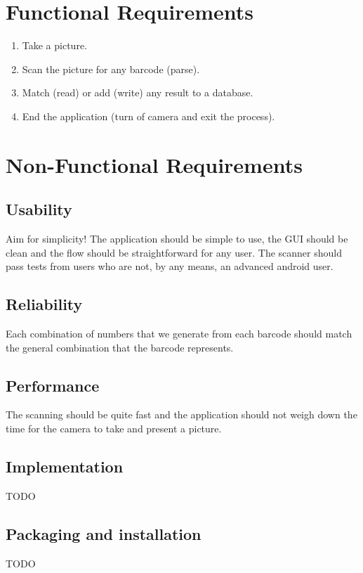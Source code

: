 \documentclass{report}
\begin{document}
\section{Functional Requirements}

\begin{enumerate}
  \item Take a picture.
  \item Scan the picture for any barcode (parse).
  \item Match (read) or add (write) any result to a database.
  \item End the application (turn of camera and exit the process).
\end{enumerate}

\section{Non-Functional Requirements}

\subsection{Usability}
Aim for simplicity! The application should be simple to use, the GUI should be clean and the flow should be straightforward for any user. The scanner should pass tests from users who are not, by any means, an advanced android user. 

\subsection{Reliability}
Each combination of numbers that we generate from each barcode should match the general combination that the barcode represents.

\subsection{Performance}
The scanning should be quite fast and the application should not weigh down the time for the camera to take and present a picture. 

\subsection{Implementation}
TODO

\subsection{Packaging and installation}
TODO
\end{document}
